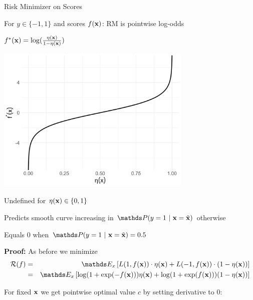 \documentclass[11pt,compress,t,notes=noshow, xcolor=table]{beamer}
\begin{document}
\begin{vbframe}{Risk Minimizer on Scores}


\begin{itemizeS}
    \item For $y \in \{-1, 1\}$ and scores $f(\mathbf{x})$: RM is pointwise log-odds
\end{itemizeS}


\begin{minipage}{0.3\textwidth} 
	\centering
	{$f^{\ast}(\mathbf{x}) =  \log (\frac{\eta(\mathbf{x}) }{1-\eta(\mathbf{x}) })$}
\end{minipage}
\hspace{-.03\textwidth}
\begin{minipage}{0.7\textwidth}
	\centering	
	\includegraphics[width=0.7\textwidth]{figure/logistic_inverse.png}
\end{minipage}

\begin{itemizeM}
    \item Undefined for $\eta(\mathbf{x}) \in \{0, 1\}$
    \item Predicts smooth curve increasing in $\P(y=1~|~\xv = \xtil)$ otherwise
    \item Equals $0$ when $\P(y=1~|~\xv = \xtil) = 0.5$
\end{itemizeM}


\framebreak 

\textbf{Proof: } As before we minimize 
\begin{eqnarray*}
  \riskf &=& \E_x \left[L(1, \fx) \cdot \eta(\xv) + L(-1, \fx) \cdot (1 - \eta(\xv)) \right] \\
  &=& \E_x \left[ \log(1 + \exp(- \fx)) \eta(\xv)+ \log(1 + \exp(\fx)) (1 - \eta(\xv)) \right] 
\end{eqnarray*}

For fixed $\mathbf{x}$ we get pointwise optimal value $c$ by setting derivative to $0$: 


\end{vbframe}
\end{document}
